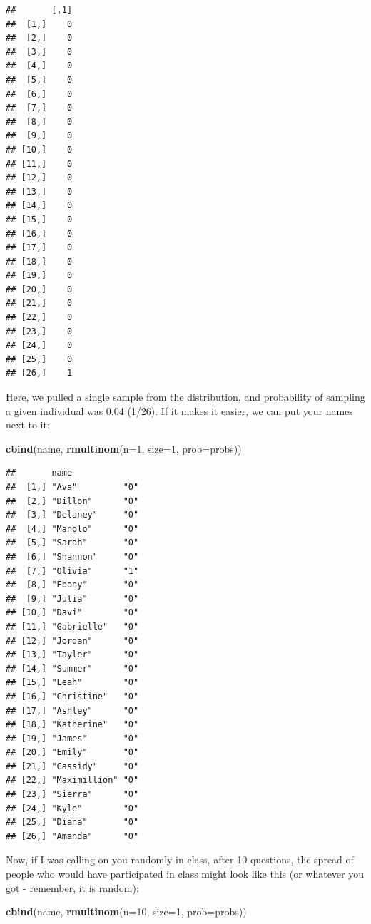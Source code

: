 \documentclass[
]{book}
\newenvironment{Shaded}{\begin{snugshade}}{\end{snugshade}}
\newcommand{\DataTypeTok}[1]{\textcolor[rgb]{0.13,0.29,0.53}{#1}}
\newcommand{\DecValTok}[1]{\textcolor[rgb]{0.00,0.00,0.81}{#1}}
\newcommand{\KeywordTok}[1]{\textcolor[rgb]{0.13,0.29,0.53}{\textbf{#1}}}
\newcommand{\NormalTok}[1]{#1}
\begin{document}
\begin{verbatim}
##       [,1]
##  [1,]    0
##  [2,]    0
##  [3,]    0
##  [4,]    0
##  [5,]    0
##  [6,]    0
##  [7,]    0
##  [8,]    0
##  [9,]    0
## [10,]    0
## [11,]    0
## [12,]    0
## [13,]    0
## [14,]    0
## [15,]    0
## [16,]    0
## [17,]    0
## [18,]    0
## [19,]    0
## [20,]    0
## [21,]    0
## [22,]    0
## [23,]    0
## [24,]    0
## [25,]    0
## [26,]    1
\end{verbatim}

Here, we pulled a single sample from the distribution, and probability of sampling a given individual was 0.04 (1/26). If it makes it easier, we can put your names next to it:

\begin{Shaded}
\begin{Highlighting}[]
\KeywordTok{cbind}\NormalTok{(name, }\KeywordTok{rmultinom}\NormalTok{(}\DataTypeTok{n=}\DecValTok{1}\NormalTok{, }\DataTypeTok{size=}\DecValTok{1}\NormalTok{, }\DataTypeTok{prob=}\NormalTok{probs))}
\end{Highlighting}
\end{Shaded}

\begin{verbatim}
##       name             
##  [1,] "Ava"         "0"
##  [2,] "Dillon"      "0"
##  [3,] "Delaney"     "0"
##  [4,] "Manolo"      "0"
##  [5,] "Sarah"       "0"
##  [6,] "Shannon"     "0"
##  [7,] "Olivia"      "1"
##  [8,] "Ebony"       "0"
##  [9,] "Julia"       "0"
## [10,] "Davi"        "0"
## [11,] "Gabrielle"   "0"
## [12,] "Jordan"      "0"
## [13,] "Tayler"      "0"
## [14,] "Summer"      "0"
## [15,] "Leah"        "0"
## [16,] "Christine"   "0"
## [17,] "Ashley"      "0"
## [18,] "Katherine"   "0"
## [19,] "James"       "0"
## [20,] "Emily"       "0"
## [21,] "Cassidy"     "0"
## [22,] "Maximillion" "0"
## [23,] "Sierra"      "0"
## [24,] "Kyle"        "0"
## [25,] "Diana"       "0"
## [26,] "Amanda"      "0"
\end{verbatim}

Now, if I was calling on you randomly in class, after 10 questions, the spread of people who would have participated in class might look like this (or whatever you got - remember, it is random):

\begin{Shaded}
\begin{Highlighting}[]
\KeywordTok{cbind}\NormalTok{(name, }\KeywordTok{rmultinom}\NormalTok{(}\DataTypeTok{n=}\DecValTok{10}\NormalTok{, }\DataTypeTok{size=}\DecValTok{1}\NormalTok{, }\DataTypeTok{prob=}\NormalTok{probs))}
\end{Highlighting}
\end{Shaded}
\end{document}
